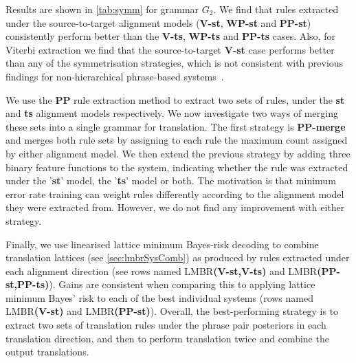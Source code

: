 Results are shown in \autoref{tab:symm} for grammar $G_2$. We find that rules
extracted under the source-to-target alignment models ({\bf V-st}, {\bf WP-st}
and {\bf PP-st}) consistently perform better than the {\bf V-ts}, {\bf WP-ts}
and {\bf PP-ts} cases. Also, for Viterbi extraction we find that the
source-to-target {\bf V-st} case performs better than any of the symmetrisation
strategies, which is not consistent with previous findings for non-hierarchical
phrase-based systems~\citep{koehn-och-marcu:2003:NAACL}.

We use the {\bf PP} rule extraction method to extract two sets of rules, under
the {\bf st} and {\bf ts} alignment models respectively. We now investigate two
ways of merging these sets into a single grammar for translation. The first
strategy is {\bf PP-merge} and merges both rule sets by assigning to each rule
the maximum count assigned by either alignment model. We then extend the
previous strategy by adding three binary feature functions to the system,
indicating whether the rule was extracted under the '{\bf st}' model, the
'{\bf ts}' model or both. The motivation is that minimum error rate training can
weight rules differently according to the alignment model they were extracted
from. However, we do not find any improvement with either strategy.

Finally, we use linearised lattice minimum Bayes-risk
decoding
to combine translation
lattices (see \autoref{sec:lmbrSysComb}) as produced by
rules extracted under each alignment direction (see rows named
LMBR{\bf(V-st,V-ts)} and LMBR{\bf(PP-st,PP-ts)}). Gains are consistent when
comparing this to applying lattice minimum Bayes' risk to each of the best
individual systems (rows named LMBR{\bf(V-st)} and LMBR{\bf(PP-st)}). Overall,
the best-performing strategy is to extract two sets of translation rules under
the phrase pair posteriors in each translation direction, and then to perform
translation twice and combine the output translations.

